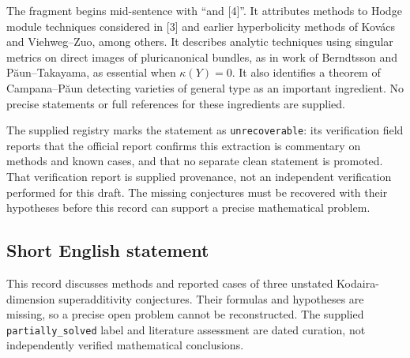 \documentclass[11pt]{article}
\begin{document}
The fragment begins mid-sentence with ``and [4]''. It attributes methods to Hodge module techniques considered in [3] and earlier hyperbolicity methods of Kov\'acs and Viehweg--Zuo, among others. It describes analytic techniques using singular metrics on direct images of pluricanonical bundles, as in work of Berndtsson and P\u{a}un--Takayama, as essential when \(\kappa(Y)=0\). It also identifies a theorem of Campana--P\u{a}un detecting varieties of general type as an important ingredient. No precise statements or full references for these ingredients are supplied.

The supplied registry marks the statement as \texttt{unrecoverable}: its verification field reports that the official report confirms this extraction is commentary on methods and known cases, and that no separate clean statement is promoted. That verification report is supplied provenance, not an independent verification performed for this draft. The missing conjectures must be recovered with their hypotheses before this record can support a precise mathematical problem.
\subsection{Short English statement}
This record discusses methods and reported cases of three unstated Kodaira-dimension superadditivity conjectures. Their formulas and hypotheses are missing, so a precise open problem cannot be reconstructed. The supplied \texttt{partially\_solved} label and literature assessment are dated curation, not independently verified mathematical conclusions.
\end{document}

